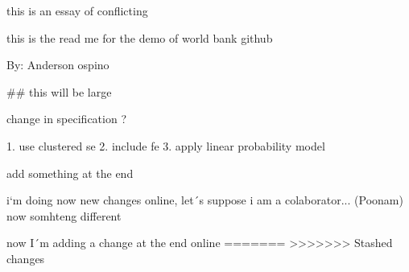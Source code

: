
this is an essay of conflicting

this is the read me for the demo of world bank github

By: Anderson ospino

## this will be large



change in specification ?

1. use clustered se
2. include fe
3. apply linear probability model

add something at the end








i`m doing now new changes online, let´s suppose i am a colaborator... (Poonam)
now somhteng different


now I´m adding a change at the end online
=======
>>>>>>> Stashed changes
